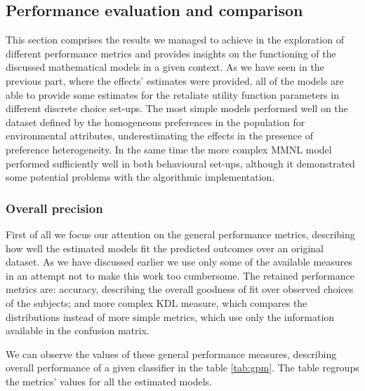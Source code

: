 \documentclass[11pt,]{article}
\title{}
\author{}
\date{}
\begin{document}
\hypertarget{performance-evaluation-and-comparison}{%
\subsection{Performance evaluation and
comparison}\label{performance-evaluation-and-comparison}}

This section comprises the results we managed to achieve in the
exploration of different performance metrics and provides insights on
the functioning of the discussed mathematical models in a given context.
As we have seen in the previous part, where the effects' estimates were
provided, all of the models are able to provide some estimates for the
retaliate utility function parameters in different discrete choice
set-ups. The most simple models performed well on the dataset defined by
the homogeneous preferences in the population for environmental
attributes, underestimating the effects in the presence of preference
heterogeneity. In the same time the more complex MMNL model performed
sufficiently well in both behavioural set-ups, although it demonstrated
some potential problems with the algorithmic implementation.

\hypertarget{overall-precision}{%
\subsubsection{Overall precision}\label{overall-precision}}

\FloatBarrier

First of all we focus our attention on the general performance metrics,
describing how well the estimated models fit the predicted outcomes over
an original dataset. As we have discussed earlier we use only some of
the available measures in an attempt not to make this work too
cumbersome. The retained performance metrics are: accuracy, describing
the overall goodness of fit over observed choices of the subjects; and
more complex KDL measure, which compares the distributions instead of
more simple metrics, which use only the information available in the
confusion matrix.

We can observe the values of these general performance measures,
describing overall performance of a given classifier in the table
\ref{tab:gpm}. The table regroups the metrics' values for all the
estimated models.
\end{document}
